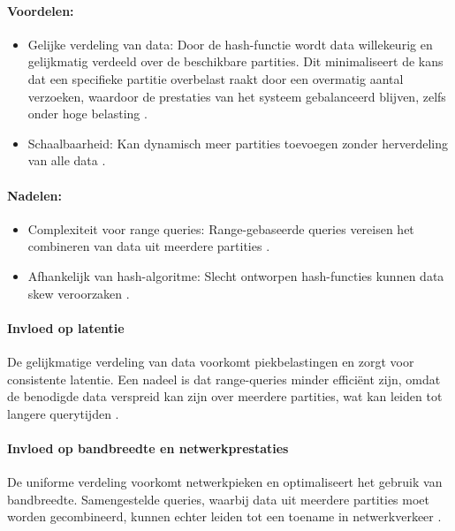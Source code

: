 \paragraph{Voordelen:}
\begin{itemize}
    \item Gelijke verdeling van data: Door de hash-functie wordt data willekeurig en gelijkmatig verdeeld over de beschikbare partities. Dit minimaliseert de kans dat een specifieke partitie overbelast raakt door een overmatig aantal verzoeken, waardoor de prestaties van het systeem gebalanceerd blijven, zelfs onder hoge belasting \autocite{Ponnusamy2024,Mahmud2020}.
    \item Schaalbaarheid: Kan dynamisch meer partities toevoegen zonder herverdeling van alle data \autocite{Mahmud2020}.
\end{itemize}
 
\paragraph{Nadelen:}
\begin{itemize}
    \item Complexiteit voor range queries: Range-gebaseerde queries vereisen het combineren van data uit meerdere partities \autocite{Mahmud2020}.
    \item Afhankelijk van hash-algoritme: Slecht ontworpen hash-functies kunnen data skew veroorzaken \autocite{Ponnusamy2024}.
\end{itemize}
 
\paragraph{Invloed op latentie} 
De gelijkmatige verdeling van data voorkomt piekbelastingen en zorgt voor consistente latentie. Een nadeel is dat range-queries minder efficiënt zijn, omdat de benodigde data verspreid kan zijn over meerdere partities, wat kan leiden tot langere querytijden \autocite{Mahmud2020}.
 
\paragraph{Invloed op bandbreedte en netwerkprestaties} 
De uniforme verdeling voorkomt netwerkpieken en optimaliseert het gebruik van bandbreedte. Samengestelde queries, waarbij data uit meerdere partities moet worden gecombineerd, kunnen echter leiden tot een toename in netwerkverkeer \autocite{Mahmud2020}.
 
